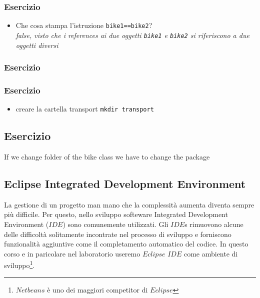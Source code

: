 \documentclass{article}
\theoremstyle{definition}
\begin{document}
\subsubsection{Esercizio}




\begin{itemize}
\item Che cosa stampa l'istruzione  \texttt{bike1==bike2}?\\
 \emph{false, visto che i references ai due oggetti  \texttt{bike1} e \texttt{bike2} si riferiscono a due oggetti diversi}
\end{itemize}


\subsubsection{Esercizio}



\subsubsection{Esercizio}

\begin{itemize}
\item creare la cartella transport \texttt{mkdir transport}
\end{itemize}


\subsection{Esercizio}




If we change folder of the bike class we have to change the package

\subsection{Eclipse Integrated Development Environment}
La gestione di un progetto man mano che la complessit\`a aumenta diventa sempre pi\`u difficile. Per questo, nello sviluppo softeware  Integrated Development Environment ($IDE$) sono comunemente utilizzati. Gli $IDE$s rimuovono alcune delle difficolt\`a solitamente incontrate nel processo di sviluppo e forniscono funzionalit\`a aggiuntive come il completamento automatico del codice. In questo corso e in paricolare nel laboratorio useremo $Eclipse$ $IDE$ come ambiente di sviluppo\footnote{$Netbeans$ \`e uno dei maggiori competitor di $Eclipse$}.  
\end{document}
